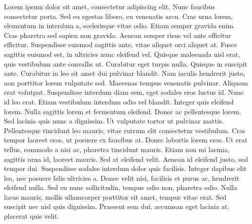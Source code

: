 Lorem ipsum dolor sit amet, consectetur adipiscing elit. Nunc faucibus consectetur porta. Sed eu egestas libero, eu venenatis arcu. Cras urna lorem, elementum in interdum a, scelerisque vitae odio. Etiam semper gravida enim. Cras pharetra sed sapien non gravida. Aenean semper risus vel ante efficitur efficitur. Suspendisse euismod sagittis ante, vitae aliquet orci aliquet at. Fusce sagittis euismod est, in ultricies nunc eleifend vel. Quisque malesuada nisl erat, quis vestibulum ante convallis ut. Curabitur eget turpis nulla. Quisque in suscipit ante. Curabitur in leo sit amet dui pulvinar blandit.
Nam iaculis hendrerit justo, non porttitor lorem vulputate sed. Maecenas tempus venenatis pulvinar. Aliquam erat volutpat. Suspendisse interdum diam sem, eget sodales eros luctus id. Nunc id leo erat. Etiam vestibulum interdum odio vel blandit. Integer quis eleifend lorem. Nulla sagittis lorem et fermentum eleifend. Donec ac pellentesque lorem. Sed lacinia quis nunc a dignissim. Ut vulputate tortor ut pulvinar mattis. Pellentesque tincidunt leo mauris, vitae rutrum elit consectetur vestibulum. Cras tempor laoreet eros, ut posuere ex faucibus at. Donec lobortis lorem eros. Ut erat tellus, commodo a nisi ac, pharetra tincidunt mauris.  Etiam non mi lacinia, sagittis urna id, laoreet mauris. Sed at eleifend velit. Aenean id eleifend justo, sed tempor dui. Suspendisse sodales interdum dolor quis facilisis. Integer dapibus elit leo, nec posuere felis ultricies a. Donec velit nisi, facilisis et purus ac, hendrerit eleifend nulla. Sed eu nunc sollicitudin, tempus odio non, pharetra odio. Nulla lacus mauris, mollis ullamcorper porttitor sit amet, tempus vitae erat. Sed suscipit nec nisl quis dignissim. Praesent sem dui, accumsan eget lacinia at, placerat quis velit.